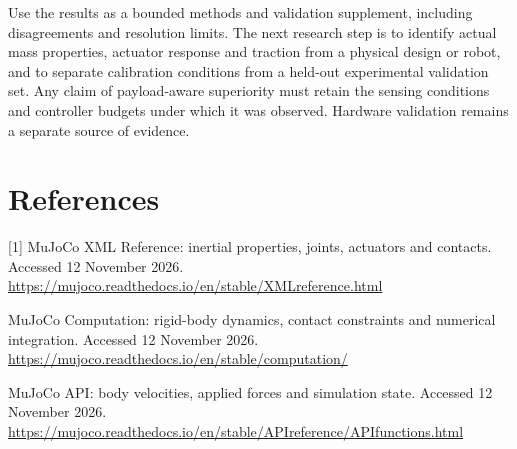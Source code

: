 \documentclass[11pt,a4paper]{article}
\begin{document}
Use the results as a bounded methods and validation supplement, including disagreements and resolution limits. The next research step is to identify actual mass properties, actuator response and traction from a physical design or robot, and to separate calibration conditions from a held-out experimental validation set. Any claim of payload-aware superiority must retain the sensing conditions and controller budgets under which it was observed. Hardware validation remains a separate source of evidence.

\section*{References}
[1] MuJoCo XML Reference: inertial properties, joints, actuators and contacts. Accessed 12 November 2026. \url{https://mujoco.readthedocs.io/en/stable/XMLreference.html}\par
[2] MuJoCo Computation: rigid-body dynamics, contact constraints and numerical integration. Accessed 12 November 2026. \url{https://mujoco.readthedocs.io/en/stable/computation/}\par
[3] MuJoCo API: body velocities, applied forces and simulation state. Accessed 12 November 2026. \url{https://mujoco.readthedocs.io/en/stable/APIreference/APIfunctions.html}\par
\end{document}
